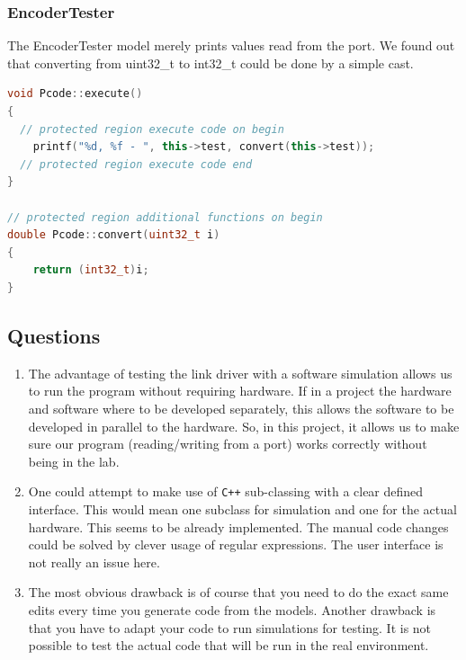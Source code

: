 \documentclass[a4paper,twoside,11pt]{article}
\newcommand{\cpp}{{\tt C++} }
\begin{document}
\subsubsection{EncoderTester}
The EncoderTester model merely prints values read from the port. We found out 
that converting from uint32\_t to int32\_t could be done by a simple cast. 
\begin{lstlisting}[caption=Relevant EncoderTester functions, label=code:enc, language=C++]
void Pcode::execute()
{
  // protected region execute code on begin
	printf("%d, %f - ", this->test, convert(this->test));
  // protected region execute code end
}

// protected region additional functions on begin
double Pcode::convert(uint32_t i)
{
	return (int32_t)i;
}
\end{lstlisting}

\subsection{Questions}
\begin{enumerate}
	\item The advantage of testing the link driver with a software simulation 
		allows us to run the program without requiring hardware.
		If in a project the hardware and software where to be developed 
		separately, this allows the software to be developed in parallel to the hardware.
		So, in this project, it allows us to make sure our program (reading/writing from a port) works correctly without being in the lab.
	\item One could attempt to make use of \cpp sub-classing with a clear defined interface.
		This would mean one subclass for simulation and one for the actual hardware.
		This seems to be already implemented. The manual code changes could be solved by clever usage of regular expressions. The user interface is not really an issue here.
	\item The most obvious drawback is of course that you need to do the exact same edits every time you generate code from the models. Another drawback is that you have to adapt your code to run simulations for testing. It is not possible to test the actual code that will be run in the real environment.
\end{enumerate}
\end{document}
